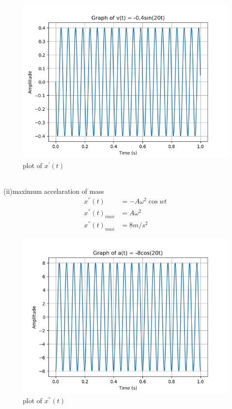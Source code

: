 \documentclass[journal,12pt,twocolumn]{IEEEtran}
\theoremstyle{remark}
\begin{document}
\begin{figure}[h!]
    \centering
    \includegraphics[width=1.1\linewidth]{figs/analog2.png}
    \caption{plot of $x^{'}(t)$}
\end{figure}\\
(ii)maximum accelaration of mass\\
\begin{align}
   x^{''}(t)&=-A\omega^2 \cos{wt}\\
    x^{''}(t)_{max}&=A\omega^2\\
    x^{''}(t)_{max}&=8m/s^2
\end{align}
\begin{figure}[h!]
    \centering
    \includegraphics[width=1.1\linewidth]{figs/analog3.png}
    \caption{plot of $x^{''}(t)$}
\end{figure}
\end{document}
